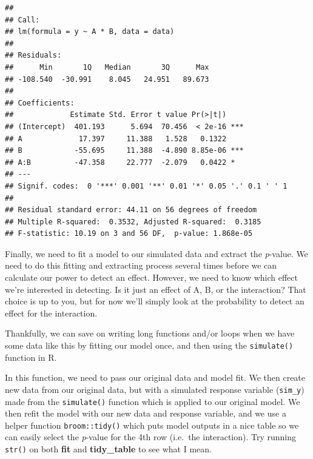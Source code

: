 \documentclass[
]{book}
\newenvironment{Shaded}{\begin{snugshade}}{\end{snugshade}}
\newcommand{\AttributeTok}[1]{\textcolor[rgb]{0.77,0.63,0.00}{#1}}
\newcommand{\CommentTok}[1]{\textcolor[rgb]{0.56,0.35,0.01}{\textit{#1}}}
\newcommand{\ControlFlowTok}[1]{\textcolor[rgb]{0.13,0.29,0.53}{\textbf{#1}}}
\newcommand{\DecValTok}[1]{\textcolor[rgb]{0.00,0.00,0.81}{#1}}
\newcommand{\FunctionTok}[1]{\textcolor[rgb]{0.00,0.00,0.00}{#1}}
\newcommand{\NormalTok}[1]{#1}
\newcommand{\OtherTok}[1]{\textcolor[rgb]{0.56,0.35,0.01}{#1}}
\newcommand{\SpecialCharTok}[1]{\textcolor[rgb]{0.00,0.00,0.00}{#1}}
\begin{document}
\begin{verbatim}
## 
## Call:
## lm(formula = y ~ A * B, data = data)
## 
## Residuals:
##      Min       1Q   Median       3Q      Max 
## -108.540  -30.991    8.045   24.951   89.673 
## 
## Coefficients:
##             Estimate Std. Error t value Pr(>|t|)    
## (Intercept)  401.193      5.694  70.456  < 2e-16 ***
## A             17.397     11.388   1.528   0.1322    
## B            -55.695     11.388  -4.890 8.85e-06 ***
## A:B          -47.358     22.777  -2.079   0.0422 *  
## ---
## Signif. codes:  0 '***' 0.001 '**' 0.01 '*' 0.05 '.' 0.1 ' ' 1
## 
## Residual standard error: 44.11 on 56 degrees of freedom
## Multiple R-squared:  0.3532, Adjusted R-squared:  0.3185 
## F-statistic: 10.19 on 3 and 56 DF,  p-value: 1.868e-05
\end{verbatim}

Finally, we need to fit a model to our simulated data and extract the \emph{p}-value. We need to do this fitting and extracting process several times before we can calculate our power to detect an effect. However, we need to know which effect we're interested in detecting. Is it just an effect of A, B, or the interaction? That choice is up to you, but for now we'll simply look at the probability to detect an effect for the interaction.

Thankfully, we can save on writing long functions and/or loops when we have some data like this by fitting our model once, and then using the \texttt{simulate()} function in R.

In this function, we need to pass our original data and model fit. We then create new data from our original data, but with a simulated response variable (\texttt{sim\_y}) made from the \texttt{simulate()} function which is applied to our original model. We then refit the model with our new data and response variable, and we use a helper function \texttt{broom::tidy()} which puts model outputs in a nice table so we can easily select the \emph{p}-value for the 4th row (i.e.~the interaction). Try running \texttt{str()} on both \textbf{fit} and \textbf{tidy\_table} to see what I mean.

\begin{Shaded}
\end{Shaded}
\end{document}
